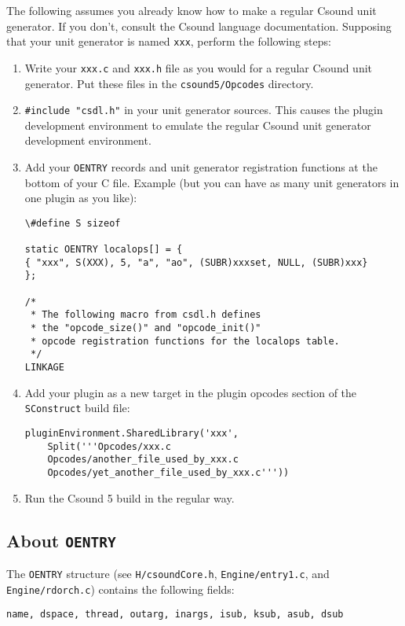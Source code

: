 \documentclass[10pt,letterpaper,onecolumn]{ltxguide}
\begin{document}
The following assumes you already know how to make a regular Csound unit generator. If you don't, consult the Csound language documentation.
Supposing that your unit generator is named \texttt{xxx}, perform the following steps:
\begin{enumerate}
\item Write your \texttt{xxx.c} and \texttt{xxx.h} file as you would for a regular Csound unit generator. Put these files in the \texttt{csound5/Opcodes} directory.
\item \texttt{\#include "csdl.h"} in your unit generator sources. This causes the plugin development environment to emulate the regular Csound unit generator development environment.
\item Add your \texttt{OENTRY} records and unit generator registration functions at the bottom of your C file. Example (but you can have as many unit generators in one plugin as you like):
\begin{verbatim}
\#define S sizeof

static OENTRY localops[] = {
{ "xxx", S(XXX), 5, "a", "ao", (SUBR)xxxset, NULL, (SUBR)xxx}
};

/*
 * The following macro from csdl.h defines 
 * the "opcode_size()" and "opcode_init()" 
 * opcode registration functions for the localops table.
 */
LINKAGE
\end{verbatim}
\item Add your plugin as a new target in the plugin opcodes section of the \texttt{SConstruct} build file:
\begin{verbatim}
pluginEnvironment.SharedLibrary('xxx', 
    Split('''Opcodes/xxx.c 
    Opcodes/another_file_used_by_xxx.c 
    Opcodes/yet_another_file_used_by_xxx.c'''))
\end{verbatim}
\item Run the Csound 5 build in the regular way.
\end{enumerate}		

\subsection{About \texttt{OENTRY}}

The \texttt{OENTRY} structure (see \texttt{H/csoundCore.h}, \texttt{Engine/entry1.c}, and \texttt{Engine/rdorch.c}) contains the following fields:

\begin{verbatim}
name, dspace, thread, outarg, inargs, isub, ksub, asub, dsub
\end{verbatim}
\end{document}
